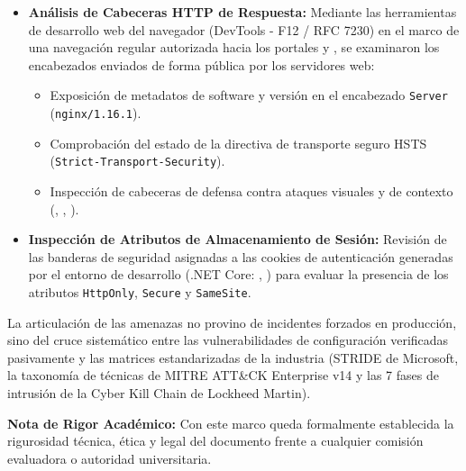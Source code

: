 \begin{itemize}[itemsep=1.5pt,topsep=1.5pt,parsep=0pt,partopsep=0pt]
    \item \textbf{Análisis de Cabeceras HTTP de Respuesta:} Mediante las herramientas de desarrollo web del navegador (DevTools - F12 / RFC 7230) en el marco de una navegación regular autorizada hacia los portales  y , se examinaron los encabezados enviados de forma pública por los servidores web:
    \begin{itemize}[itemsep=1pt,topsep=1pt,parsep=0pt,partopsep=0pt]
        \item Exposición de metadatos de software y versión en el encabezado \texttt{Server} (\texttt{nginx/1.16.1}).
        \item Comprobación del estado de la directiva de transporte seguro HSTS (\texttt{Strict-}\allowbreak\texttt{Transport-}\allowbreak\texttt{Security}).
        \item Inspección de cabeceras de defensa contra ataques visuales y de contexto (, \allowbreak{}, \allowbreak{}).
    \end{itemize}
    
    \item \textbf{Inspección de Atributos de Almacenamiento de Sesión:} Revisión de las banderas de seguridad asignadas a las cookies de autenticación generadas por el entorno de desarrollo (.NET Core: , ) para evaluar la presencia de los atributos \texttt{HttpOnly}, \texttt{Secure} y \texttt{SameSite}.
\end{itemize}


La articulación de las amenazas no provino de incidentes forzados en producción, sino del cruce sistemático entre las vulnerabilidades de configuración verificadas pasivamente y las matrices estandarizadas de la industria (STRIDE de Microsoft, la taxonomía de técnicas de MITRE ATT\&CK Enterprise v14 y las 7 fases de intrusión de la Cyber Kill Chain de Lockheed Martin).

\begin{tcolorbox}[
    colback=outermarginbgcolor!40,
    colframe=outermarginfgcolor,
    arc=1.5mm,
    boxrule=0.8pt,
    left=3mm,right=3mm,top=2mm,bottom=2mm,
    before skip=0.5em,after skip=0.5em
]
\textbf{Nota de Rigor Académico:} Con este marco queda formalmente establecida la rigurosidad técnica, ética y legal del documento frente a cualquier comisión evaluadora o autoridad universitaria.
\end{tcolorbox}
\clearpage
